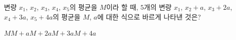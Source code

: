 변량 $x_1$, $x_2$, $x_3$, $x_4$, $x_5$의 평균을 $M$이라 할 때, $5$개의 변량 $x_1$, $x_2+a$, $x_3+2a$, $x_4+3a$, $x_5+4a$의 평균을 $M$, $a$에 대한 식으로 바르게 나타낸 것은?
\begin{choices32}{$M$}{$M+a$}{$M+2a$}{$M+3a$}{$M+4a$}\end{choices32}
